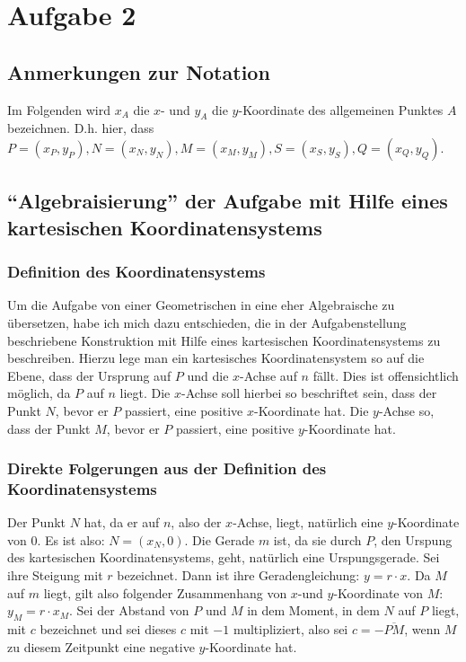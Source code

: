 \section{Aufgabe 2}

\subsection*{Anmerkungen zur Notation}

Im Folgenden wird $x_A$ die $x$- und $y_A$ die $y$-Koordinate des allgemeinen Punktes $A$ bezeichnen. D.h. hier, dass 
$P=(x_P, y_P), N=(x_N, y_N), M=(x_M, y_M), S=(x_S, y_S), Q=(x_Q, y_Q)$.

\subsection*{"`Algebraisierung"' der Aufgabe mit Hilfe eines kartesischen Koordinatensystems}

\subsubsection*{Definition des Koordinatensystems}

Um die Aufgabe von einer Geometrischen in eine eher Algebraische zu übersetzen, habe ich mich dazu entschieden, die 
in der Aufgabenstellung beschriebene Konstruktion mit Hilfe eines kartesischen Koordinatensystems zu beschreiben. 
Hierzu lege man ein kartesisches Koordinatensystem so auf die Ebene, dass der Ursprung auf $P$ und die $x$-Achse auf 
$n$ fällt. Dies ist offensichtlich möglich, da $P$ auf $n$ liegt. Die $x$-Achse soll hierbei so beschriftet sein, 
dass der Punkt $N$, bevor er $P$ passiert, eine positive $x$-Koordinate hat. Die $y$-Achse so, dass der Punkt $M$, 
bevor er $P$ passiert, eine positive $y$-Koordinate hat.

\subsubsection*{Direkte Folgerungen aus der Definition des Koordinatensystems}

Der Punkt $N$ hat, da er auf $n$, also der $x$-Achse, liegt, natürlich eine $y$-Koordinate von 0. Es ist also: 
$N=(x_N, 0)$. Die Gerade $m$ ist, da sie durch $P$, den Urspung des kartesischen Koordinatensystems, geht, natürlich 
eine Urspungsgerade. Sei ihre Steigung mit $r$ bezeichnet. Dann ist ihre Geradengleichung: $y=r\cdot x$. Da $M$ auf 
$m$ liegt, gilt also folgender Zusammenhang von $x$-und $y$-Koordinate von $M$: $y_M=r\cdot x_M$. Sei der Abstand 
von $P$ und $M$ in dem Moment, in dem $N$ auf $P$ liegt, mit $c$ bezeichnet und sei dieses $c$ mit $-1$ multipliziert, 
also sei $c=-\overline{PM}$, wenn $M$ zu diesem Zeitpunkt eine negative $y$-Koordinate hat.